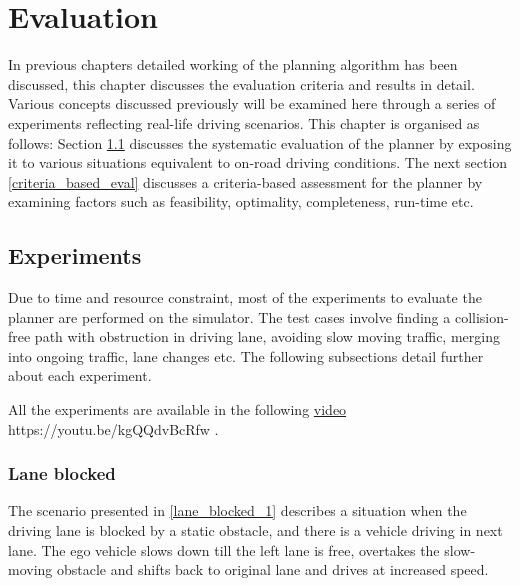 \chapter{Evaluation}
\label{evaluation}
In previous chapters detailed working of the planning algorithm has been discussed, this chapter discusses the evaluation criteria and results in detail. Various concepts discussed previously will be examined here through a series of experiments reflecting real-life driving scenarios. This chapter is organised as follows: Section \ref{experiments} discusses the systematic evaluation of the planner by exposing it to various situations equivalent to on-road driving conditions. The next section \ref{criteria_based_eval} discusses a criteria-based assessment for the planner by examining factors such as feasibility, optimality, completeness, run-time etc.

\section{Experiments}\label{experiments}
Due to time and resource constraint, most of the experiments to evaluate the planner are performed on the simulator. The test cases involve finding a collision-free path with obstruction in driving lane, avoiding slow moving traffic, merging into ongoing traffic, lane changes etc. The following subsections detail further about each experiment. 

All the experiments are available in the following \href{https://youtu.be/kgQQdvBcRfw}{video}
\newline https://youtu.be/kgQQdvBcRfw .

\subsection{Lane blocked}
The scenario presented in \ref{lane_blocked_1} describes a situation when the driving lane is blocked by a static obstacle, and there is a vehicle driving in next lane. The ego vehicle slows down till the left lane is free, overtakes the slow-moving obstacle and shifts back to original lane and drives at increased speed. 

